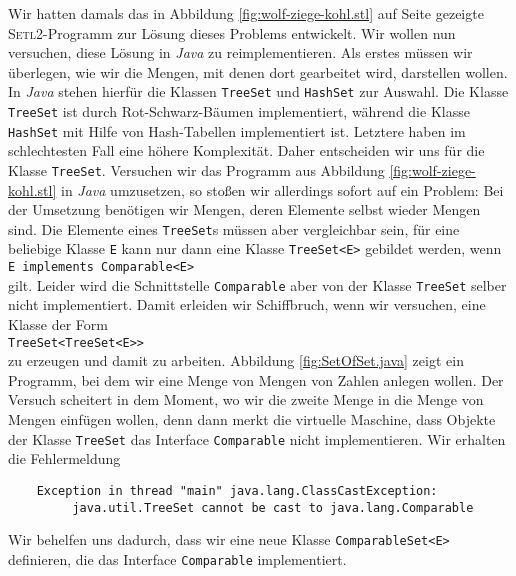 \noindent
Wir hatten damals das in Abbildung
\ref{fig:wolf-ziege-kohl.stl} auf Seite \pageref{fig:wolf-ziege-kohl.stl} gezeigte
\textsc{Setl2}-Programm zur L\"osung dieses Problems entwickelt.  
Wir wollen nun versuchen, diese L\"osung in  \textsl{Java} zu reimplementieren.
Als erstes m\"ussen wir \"uberlegen, wie wir die Mengen, mit denen dort gearbeitet wird,
darstellen wollen.    In \textsl{Java} stehen hierf\"ur die Klassen \texttt{TreeSet}
und \texttt{HashSet} zur Auswahl.  Die Klasse \texttt{TreeSet} ist durch
Rot-Schwarz-B\"aumen implementiert, w\"ahrend die Klasse \texttt{HashSet} mit Hilfe von
Hash-Tabellen implementiert ist.  Letztere haben im schlechtesten Fall eine h\"ohere
Komplexit\"at.  Daher entscheiden wir uns f\"ur die Klasse \texttt{TreeSet}.  Versuchen wir
das Programm aus Abbildung \ref{fig:wolf-ziege-kohl.stl} in \textsl{Java} umzusetzen,
so sto{\ss}en wir allerdings sofort auf ein Problem:  Bei der Umsetzung ben\"otigen wir Mengen,
deren Elemente selbst wieder Mengen sind.  Die Elemente eines \texttt{TreeSet}s m\"ussen
aber vergleichbar sein, f\"ur eine beliebige Klasse \texttt{E} kann nur dann eine Klasse
\texttt{TreeSet<E>} gebildet werden, wenn 
\\[0.2cm]
\hspace*{1.3cm}
\texttt{E implements Comparable<E>}
\\[0.2cm]
gilt.  Leider wird die Schnittstelle \texttt{Comparable} aber von der Klasse
\texttt{TreeSet} selber nicht implementiert.  Damit erleiden wir Schiffbruch, wenn wir
versuchen,  eine Klasse der Form 
\\[0.2cm]
\hspace*{1.3cm}
\texttt{TreeSet<TreeSet<E>>}
\\[0.2cm]
zu erzeugen und damit zu arbeiten.  Abbildung \ref{fig:SetOfSet.java} zeigt ein Programm,
bei dem wir eine Menge von Mengen von Zahlen anlegen wollen.  Der Versuch scheitert in dem
Moment, wo wir die zweite Menge in die Menge von Mengen einf\"ugen wollen, denn dann merkt
die virtuelle Maschine, dass Objekte der Klasse \texttt{TreeSet} das Interface
\texttt{Comparable} nicht implementieren.  Wir erhalten die Fehlermeldung
\begin{verbatim}
    Exception in thread "main" java.lang.ClassCastException: 
         java.util.TreeSet cannot be cast to java.lang.Comparable
\end{verbatim}
Wir behelfen uns dadurch, dass wir eine neue Klasse \texttt{ComparableSet<E>}
definieren, die das Interface \texttt{Comparable} implementiert.


